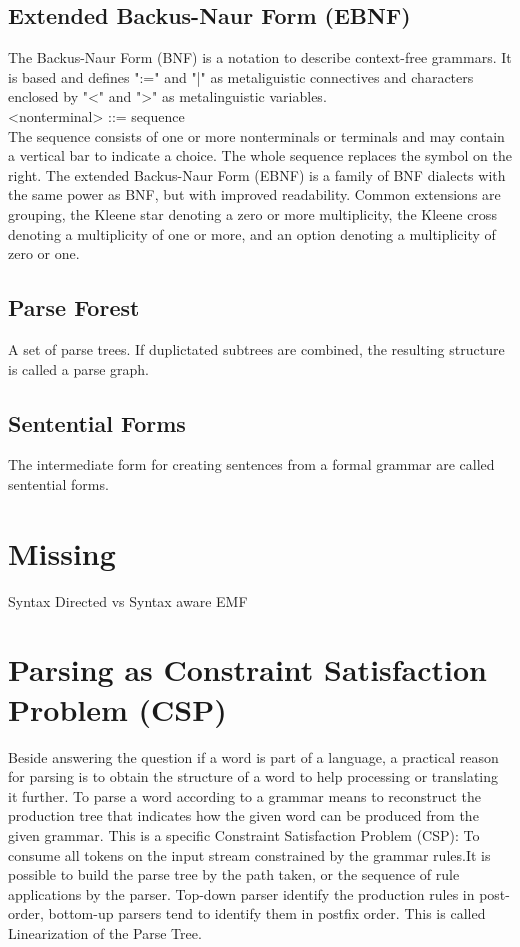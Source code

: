 \subsection{Extended Backus-Naur Form (EBNF)} 
The Backus-Naur Form (BNF) is a notation to describe context-free grammars. It is based \cite{BNF} and defines ":=" and "|" as metaliguistic connectives and characters enclosed by "<" and ">" as metalinguistic variables.\\
 <nonterminal> ::= sequence\\
The sequence consists of one or more nonterminals or terminals and may contain a vertical bar to indicate a choice. The whole sequence replaces the symbol on the right. The extended Backus-Naur Form (EBNF) is a family of BNF dialects with the same power as BNF, but with improved readability. Common extensions are grouping, the Kleene star denoting a zero or more multiplicity, the Kleene cross denoting a multiplicity of one or more, and an option denoting a multiplicity of zero or one. \cite{ParserBook}

\subsection{Parse Forest} 
A set of parse trees. If duplictated subtrees are combined, the resulting structure is called a parse graph.\cite{ParserBook}

\subsection{Sentential Forms}   
The intermediate form for creating sentences from a formal grammar are called sentential forms. \cite{ParserBook}



\section{Missing}
Syntax Directed vs Syntax aware
EMF

\section{Parsing as Constraint Satisfaction Problem (CSP)} 
Beside answering the question if a word is part of a language, a practical reason for parsing is to obtain the structure of a word to help processing or translating it further. To parse a word according to a grammar means to reconstruct the production tree that indicates how the given word can be produced from the given grammar. This is a specific Constraint Satisfaction Problem (CSP): To consume all tokens on the input stream constrained by the grammar rules.It is possible to build the parse tree by the path taken, or the sequence of rule applications by the parser.  Top-down parser identify the production rules in post-order, bottom-up parsers tend to identify them in postfix order. This is called Linearization of the Parse Tree.\cite{ParserBook}


